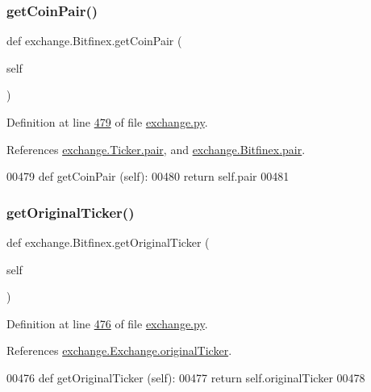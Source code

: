 \subsubsection{\texorpdfstring{get\+Coin\+Pair()}{getCoinPair()}}
{\footnotesize\ttfamily def exchange.\+Bitfinex.\+get\+Coin\+Pair (\begin{DoxyParamCaption}\item[{}]{self }\end{DoxyParamCaption})}



Definition at line \hyperlink{exchange_8py_source_l00479}{479} of file \hyperlink{exchange_8py_source}{exchange.\+py}.



References \hyperlink{exchange_8py_source_l00058}{exchange.\+Ticker.\+pair}, and \hyperlink{exchange_8py_source_l00425}{exchange.\+Bitfinex.\+pair}.


\begin{DoxyCode}
00479     \textcolor{keyword}{def }getCoinPair (self):
00480         \textcolor{keywordflow}{return} self.pair
00481         
\end{DoxyCode}
\mbox{\label{classexchange_1_1_bitfinex_a7853d59743dd4029bb218e60604dec88}} 
\subsubsection{\texorpdfstring{get\+Original\+Ticker()}{getOriginalTicker()}}
{\footnotesize\ttfamily def exchange.\+Bitfinex.\+get\+Original\+Ticker (\begin{DoxyParamCaption}\item[{}]{self }\end{DoxyParamCaption})}



Definition at line \hyperlink{exchange_8py_source_l00476}{476} of file \hyperlink{exchange_8py_source}{exchange.\+py}.



References \hyperlink{exchange_8py_source_l00186}{exchange.\+Exchange.\+original\+Ticker}.


\begin{DoxyCode}
00476     \textcolor{keyword}{def }getOriginalTicker (self):
00477         \textcolor{keywordflow}{return} self.originalTicker
00478         
\end{DoxyCode}
\mbox{\label{classexchange_1_1_bitfinex_a787c17ddae2b4f5022fc12bc2a0c0a2b}} 
